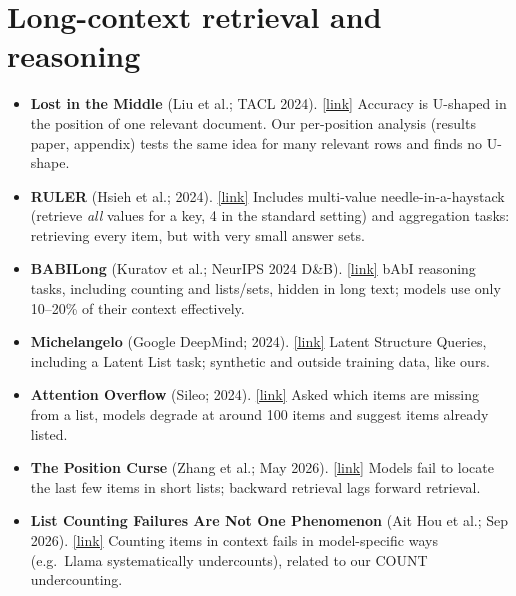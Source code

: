 \documentclass[10pt]{article}
\newcommand{\paper}[3]{\textbf{#1} \textnormal{(#2)}. \href{#3}{\small[link]}}
\begin{document}
\section*{Long-context retrieval and reasoning}
\begin{itemize}
\item \paper{Lost in the Middle}{Liu et al.; TACL 2024}{https://arxiv.org/abs/2307.03172}
Accuracy is U-shaped in the position of one relevant document. Our per-position analysis (results paper,
appendix) tests the same idea for many relevant rows and finds no U-shape.
\item \paper{RULER}{Hsieh et al.; 2024}{https://arxiv.org/abs/2404.06654}
Includes multi-value needle-in-a-haystack (retrieve \emph{all} values for a key, 4 in the standard setting) and
aggregation tasks: retrieving every item, but with very small answer sets.
\item \paper{BABILong}{Kuratov et al.; NeurIPS 2024 D\&B}{https://arxiv.org/abs/2406.10149}
bAbI reasoning tasks, including counting and lists/sets, hidden in long text; models use only 10--20\% of their
context effectively.
\item \paper{Michelangelo}{Google DeepMind; 2024}{https://deepmind.google/research/publications/michelangelo-long-context-evaluations-beyond-haystacks-via-latent-structure-queries/}
Latent Structure Queries, including a Latent List task; synthetic and outside training data, like ours.
\item \paper{Attention Overflow}{Sileo; 2024}{https://arxiv.org/abs/2407.13481}
Asked which items are missing from a list, models degrade at around 100 items and suggest items already listed.
\item \paper{The Position Curse}{Zhang et al.; May 2026}{https://arxiv.org/abs/2605.07127}
Models fail to locate the last few items in short lists; backward retrieval lags forward retrieval.
\item \paper{List Counting Failures Are Not One Phenomenon}{Ait Hou et al.; Sep 2026}{https://arxiv.org/abs/2609.22230}
Counting items in context fails in model-specific ways (e.g.\ Llama systematically undercounts), related to our
COUNT undercounting.
\end{itemize}
\end{document}
